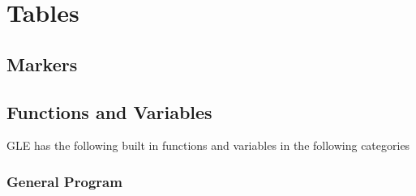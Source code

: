 \appendix
\chapter{Tables}
\section{Markers}
\mbox{}

\section{Functions and Variables}
\label{fct:sec}

GLE has the following built in functions and variables in the following categories

\subsection{General Program}

